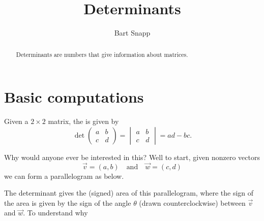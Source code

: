 \documentclass{ximera}
\author{Bart Snapp}
\title{Determinants}
\begin{document}
\begin{abstract}
  Determinants are numbers that give information about matrices.
\end{abstract}
\maketitle







\section{Basic computations}

\begin{definition}
  Given a $2\times2$ matrix, the  is given by
  \[
  \det
  \begin{pmatrix}
    a & b\\
    c & d
  \end{pmatrix}
  =
  \begin{vmatrix}
    a & b\\
    c & d
  \end{vmatrix}
  = ad -bc.
  \]
\end{definition}
Why would anyone ever be interested in this? Well to start, given nonzero vectors
\[
\vec{v} = (a,b)\quad\text{and}\quad\vec{w}=(c,d)
\]
we can form a parallelogram as below.
\begin{image}
\end{image}
The determinant gives the (signed) area of this parallelogram, where
the sign of the area is given by the sign of the angle $\theta$ (drawn
counterclockwise) between $\vec{v}$ and $\vec{w}$. To understand why
\end{document}

